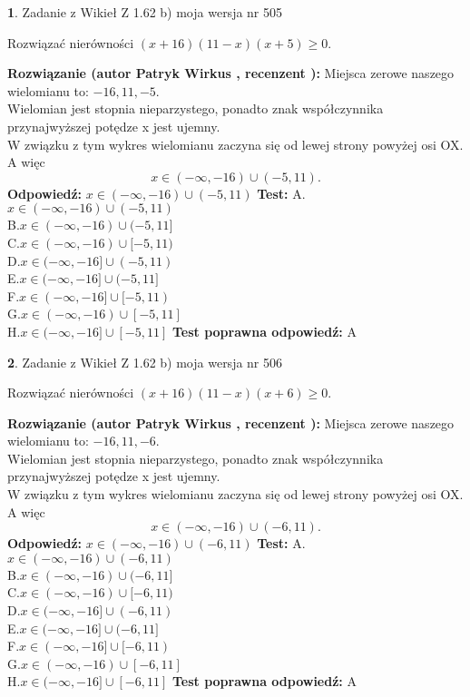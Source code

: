 \documentclass[12pt, a4paper]{article}
\theoremstyle{definition} %
\newtheorem{zad}{}
\newcommand{\zadStart}[1]{\begin{zad}#1\newline}
\newcommand{\zadStop}{\end{zad}}
\newcommand{\rozwStart}[2]{\noindent \textbf{Rozwiązanie (autor #1 , recenzent #2): }\newline}
\newcommand{\rozwStop}{\newline}
\newcommand{\odpStart}{\noindent \textbf{Odpowiedź:}\newline}
\newcommand{\odpStop}{\newline}
\newcommand{\testStart}{\noindent \textbf{Test:}\newline}
\newcommand{\testStop}{\newline}
\newcommand{\kluczStart}{\noindent \textbf{Test poprawna odpowiedź:}\newline}
\newcommand{\kluczStop}{\newline}
\begin{document}
\zadStart{Zadanie z Wikieł Z 1.62 b) moja wersja nr 505}

Rozwiązać nierówności $(x+16)(11-x)(x+5)\ge0$.
\zadStop
\rozwStart{Patryk Wirkus}{}
Miejsca zerowe naszego wielomianu to: $-16, 11, -5$.\\
Wielomian jest stopnia nieparzystego, ponadto znak współczynnika przy\linebreak najwyższej potędze x jest ujemny.\\ W związku z tym wykres wielomianu zaczyna się od lewej strony powyżej osi OX. A więc $$x \in (-\infty,-16) \cup (-5,11).$$
\rozwStop
\odpStart
$x \in (-\infty,-16) \cup (-5,11)$
\odpStop
\testStart
A.$x \in (-\infty,-16) \cup (-5,11)$\\
B.$x \in (-\infty,-16) \cup (-5,11]$\\
C.$x \in (-\infty,-16) \cup [-5,11)$\\
D.$x \in (-\infty,-16] \cup (-5,11)$\\
E.$x \in (-\infty,-16] \cup (-5,11]$\\
F.$x \in (-\infty,-16] \cup [-5,11)$\\
G.$x \in (-\infty,-16) \cup [-5,11]$\\
H.$x \in (-\infty,-16] \cup [-5,11]$
\testStop
\kluczStart
A
\kluczStop



\zadStart{Zadanie z Wikieł Z 1.62 b) moja wersja nr 506}

Rozwiązać nierówności $(x+16)(11-x)(x+6)\ge0$.
\zadStop
\rozwStart{Patryk Wirkus}{}
Miejsca zerowe naszego wielomianu to: $-16, 11, -6$.\\
Wielomian jest stopnia nieparzystego, ponadto znak współczynnika przy\linebreak najwyższej potędze x jest ujemny.\\ W związku z tym wykres wielomianu zaczyna się od lewej strony powyżej osi OX. A więc $$x \in (-\infty,-16) \cup (-6,11).$$
\rozwStop
\odpStart
$x \in (-\infty,-16) \cup (-6,11)$
\odpStop
\testStart
A.$x \in (-\infty,-16) \cup (-6,11)$\\
B.$x \in (-\infty,-16) \cup (-6,11]$\\
C.$x \in (-\infty,-16) \cup [-6,11)$\\
D.$x \in (-\infty,-16] \cup (-6,11)$\\
E.$x \in (-\infty,-16] \cup (-6,11]$\\
F.$x \in (-\infty,-16] \cup [-6,11)$\\
G.$x \in (-\infty,-16) \cup [-6,11]$\\
H.$x \in (-\infty,-16] \cup [-6,11]$
\testStop
\kluczStart
A
\kluczStop
\end{document}
